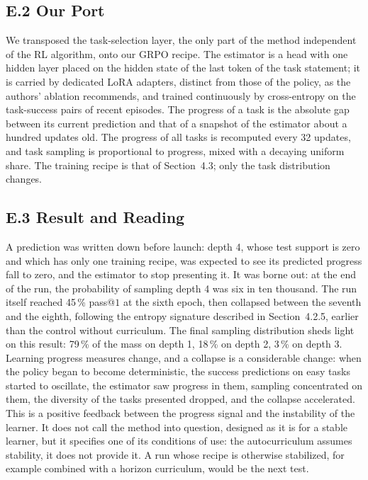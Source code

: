 \documentclass[11pt,a4paper]{article}
\begin{document}
\subsection*{E.2 Our Port}
We transposed the task-selection layer, the only part of the method independent of the RL algorithm, onto our GRPO recipe. The estimator is a head with one hidden layer placed on the hidden state of the last token of the task statement; it is carried by dedicated LoRA adapters, distinct from those of the policy, as the authors' ablation recommends, and trained continuously by cross-entropy on the task-success pairs of recent episodes. The progress of a task is the absolute gap between its current prediction and that of a snapshot of the estimator about a hundred updates old. The progress of all tasks is recomputed every 32 updates, and task sampling is proportional to progress, mixed with a decaying uniform share. The training recipe is that of Section~4.3; only the task distribution changes.

\subsection*{E.3 Result and Reading}
A prediction was written down before launch: depth 4, whose test support is zero and which has only one training recipe, was expected to see its predicted progress fall to zero, and the estimator to stop presenting it. It was borne out: at the end of the run, the probability of sampling depth 4 was six in ten thousand. The run itself reached 45\,\% pass@$1$ at the sixth epoch, then collapsed between the seventh and the eighth, following the entropy signature described in Section~4.2.5, earlier than the control without curriculum. The final sampling distribution sheds light on this result: 79\,\% of the mass on depth 1, 18\,\% on depth 2, 3\,\% on depth 3. Learning progress measures change, and a collapse is a considerable change: when the policy began to become deterministic, the success predictions on easy tasks started to oscillate, the estimator saw progress in them, sampling concentrated on them, the diversity of the tasks presented dropped, and the collapse accelerated. This is a positive feedback between the progress signal and the instability of the learner. It does not call the method into question, designed as it is for a stable learner, but it specifies one of its conditions of use: the autocurriculum assumes stability, it does not provide it. A run whose recipe is otherwise stabilized, for example combined with a horizon curriculum, would be the next test.
\end{document}
